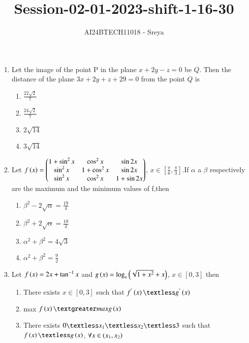\documentclass[journal,12pt,onecolumn]{IEEEtran}
\theoremstyle{remark}
\begin{document}

\vspace{3cm}

\title{Session-02-01-2023-shift-1-16-30}
\author{AI24BTECH11018 - Sreya}
\maketitle
\bigskip
\renewcommand{\thefigure}{\theenumi}
\renewcommand{\thetable}{\theenumi}
\begin{enumerate}
\item Let the image of the point P in the plane $x+2y-z=0$ be $Q$. Then the distance of the plane 
$3x + 2y + z + 29 = 0$ from the point $Q$ is
\begin{enumerate}
    \item $\frac{22\sqrt{2}}{7}$
    \item $\frac{24\sqrt{2}}{7}$
    \item $2\sqrt{14}$
    \item $3\sqrt{14}$
\end{enumerate}
\item Let $f\left(x\right)=\begin{pmatrix}
1+\sin^2{x} & \cos^2{x} & \sin 2x \\
\sin^2{x} & 1+\cos^2{x} & \sin 2x \\
\sin^2{x} & \cos^2{x} & 1+\sin 2x
\end{pmatrix}$, $x\in [\frac{\pi}{6},\frac{\pi}{3}]$.If $\alpha$ a $\beta$ respectively are the maximum and the minimum values of f,then
\begin{enumerate}
    \item $\beta^2-2\sqrt{\alpha}=\frac{19}{4}$
    \item $\beta^2+2\sqrt{\alpha}=\frac{19}{4}$
    \item $\alpha^2 + \beta^2 = 4\sqrt{3}$
    \item $\alpha^2 + \beta^2 = \frac{9}{2}$
\end{enumerate}
\item Let $f\left(x\right)=2x+\tan^{-1}x$ and $g\left(x\right)=\log_{e}\left(\sqrt{1+x^2}+x\right)$, $x\in [0,3]$ then 
\begin{enumerate}
    \item There exists $x\in [0,3]$ such that $f^{'}\brak{x} \textless g^{'}\brak{x}$
    \item max $f\brak{x} \textgreater max g\brak{x}$
    \item There exists $0 \textless x_1 \textless x_2\textless 3$ such that $f\brak{x} \textless g\brak{x}$, $\forall x\in \left(x_1,x_2\right)$

\end{enumerate}
\end{enumerate}
\end{document}
